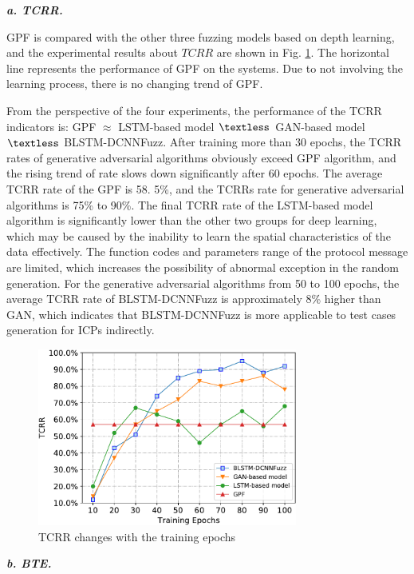 \quad \textit{\textbf{a. TCRR.}}

GPF is compared with the other three fuzzing models based on depth learning, and the experimental results about $TCRR$ are shown in Fig. \ref{FIGURE_TCRR}. The horizontal line represents the performance of GPF on the systems. Due to not involving the learning process, there is no changing trend of GPF.

From the perspective of the four experiments, the performance of the TCRR indicators is: GPF $\approx$ LSTM-based model $\textless$ GAN-based model $\textless$ BLSTM-DCNNFuzz. After training more than 30 epochs, the TCRR rates of generative adversarial algorithms obviously exceed GPF algorithm, and the rising trend of rate slows down significantly after 60 epochs. The average TCRR rate of the GPF is 58. 5\%, and the TCRRs rate for generative adversarial algorithms is 75\% to 90\%. The final TCRR rate of the LSTM-based model algorithm is significantly lower than the other two groups for deep learning, which may be caused by the inability to learn the spatial characteristics of the data effectively. The function codes and parameters range of the protocol message are limited, which increases the possibility of abnormal exception in the random generation. For the generative adversarial algorithms from 50 to 100 epochs, the average TCRR rate of BLSTM-DCNNFuzz is approximately 8\% higher than GAN, which indicates that BLSTM-DCNNFuzz is more applicable to test cases generation for ICPs indirectly.
\begin{figure}[htbp]
	\centering
	\includegraphics[width=3.36in]{FIGURE_LV/FIGURE_TCRR.pdf}
	\caption{TCRR changes with the training epochs}
	\label{FIGURE_TCRR}
\end{figure}


\quad \textit{\textbf{b. BTE.}}

